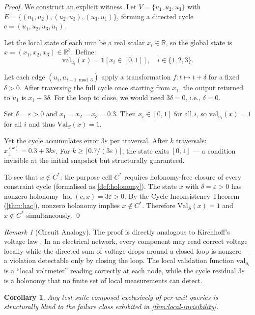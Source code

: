 \documentclass[twocolumn,a4paper,11pt]{article}
\theoremstyle{plain}
\newtheorem{corollary}[theorem]{Corollary}
\theoremstyle{definition}
\theoremstyle{remark}
\newtheorem{remark}[theorem]{Remark}
\DeclareMathOperator{\hol}{hol}
\newcommand{\Val}{\mathrm{Val}}
\begin{document}
\begin{proof}
We construct an explicit witness. Let $V = \{u_1, u_2, u_3\}$ with
$E = \{(u_1,u_2),(u_2,u_3),(u_3,u_1)\}$, forming a directed cycle
$c = (u_1, u_2, u_3, u_1)$.

Let the local state of each unit be a real scalar $x_i \in \mathbb{R}$,
so the global state is $x = (x_1, x_2, x_3) \in \mathbb{R}^3$.
Define:
\[
  \mathrm{val}_{u_i}(x) = \mathbf{1}[x_i \in [0,1]], \quad i \in
  \{1,2,3\}.
\]

Let each edge $(u_i, u_{i+1 \bmod 3})$ apply a transformation
$f: t \mapsto t + \delta$ for a fixed $\delta > 0$. After traversing
the full cycle once starting from $x_1$, the output returned to $u_1$
is $x_1 + 3\delta$. For the loop to close, we would need $3\delta = 0$,
i.e., $\delta = 0$.

Set $\delta = \varepsilon > 0$ and $x_1 = x_2 = x_3 = 0.3$. Then
$x_i \in [0,1]$ for all $i$, so $\mathrm{val}_{u_i}(x) = 1$ for all
$i$ and thus $\Val_S(x) = 1$.

Yet the cycle accumulates error $3\varepsilon$ per traversal. After $k$
traversals: $x_1^{(k)} = 0.3 + 3k\varepsilon$. For
$k \geq \lceil 0.7 / (3\varepsilon) \rceil$, the state exits $[0,1]$
--- a condition invisible at the initial snapshot but structurally
guaranteed.

To see that $x \notin C^*$: the purpose cell $C^*$ requires holonomy-free
closure of every constraint cycle (formalised as \cref{def:holonomy}). The
state $x$ with $\delta = \varepsilon > 0$ has nonzero holonomy
$\hol(c, x) = 3\varepsilon > 0$. By the Cycle Inconsistency Theorem
(\cref{thm:hac}), nonzero holonomy implies $x \notin C^*$. Therefore
$\Val_S(x) = 1$ and $x \notin C^*$ simultaneously. \qed
\end{proof}

\begin{remark}[Circuit Analogy]
The proof is directly analogous to Kirchhoff's voltage law
\cite{kirchhoff1847}. In an electrical network, every component may read
correct voltage locally while the directed sum of voltage drops around a
closed loop is nonzero --- a violation detectable only by closing the loop.
The local validation function $\mathrm{val}_{u_i}$ is a ``local voltmeter''
reading correctly at each node, while the cycle residual $3\varepsilon$ is
a holonomy that no finite set of local measurements can detect.
\end{remark}

\begin{corollary}
\label{cor:unit-test-blind}
Any test suite composed exclusively of per-unit queries is structurally
blind to the failure class exhibited in \cref{thm:local-invisibility}.
\end{corollary}
\end{document}
